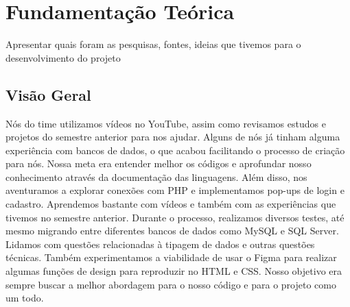 \chapter{Fundamentação Teórica}
\label{ch:identificador}
	\begin{resumocapitulo}
		Apresentar quais foram as pesquisas, fontes, ideias que tivemos para o desenvolvimento do projeto
	\end{resumocapitulo}

	\section{Visão Geral}

            Nós do time utilizamos vídeos no YouTube, assim como revisamos estudos e projetos do semestre anterior para nos ajudar. Alguns de nós já tinham alguma experiência com bancos de dados, o que acabou facilitando o processo de criação para nós. Nossa meta era entender melhor os códigos e aprofundar nosso conhecimento através da documentação das linguagens. Além disso, nos aventuramos a explorar conexões com PHP e implementamos pop-ups de login e cadastro. Aprendemos bastante com vídeos e também com as experiências que tivemos no semestre anterior.
            \vspace{12pt}
            Durante o processo, realizamos diversos testes, até mesmo migrando entre diferentes bancos de dados como MySQL e SQL Server. Lidamos com questões relacionadas à tipagem de dados e outras questões técnicas. Também experimentamos a viabilidade de usar o Figma para realizar algumas funções de design para reproduzir no HTML e CSS. Nosso objetivo era sempre buscar a melhor abordagem para o nosso código e para o projeto como um todo.

